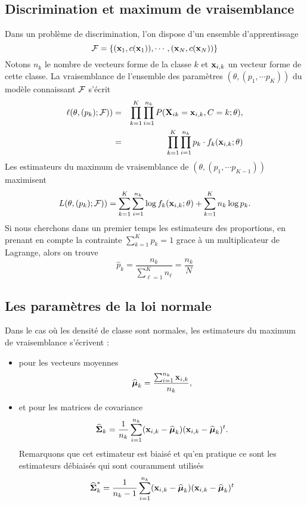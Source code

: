 \subsection{Discrimination et maximum de vraisemblance}
Dans un probl\`eme de discrimination, l'on dispose d'un ensemble 
d'apprentissage 
$$
{\cal F}=\{(\mbox{\bf x}_1,c(\mbox{\bf x}_1)),\cdots,(\mbox{\bf x}_N,c(\mbox{\bf x}_N))\}
$$
Notons $n_k$ le nombre de vecteurs forme de la classe $k$ et 
$\mbox{\bf x}_{i,k}$ un vecteur forme de cette classe. La vraisemblance
de l'ensemble des param\`etres $(\theta,(p_1,\cdots p_{K}))$ du mod\`ele
connaissant ${\cal F}$ s'\'ecrit
\begin{eqnarray*}
\ell(\theta,(p_k); {\cal F})) & = & \prod_{k=1}^K \prod_{i=1}^{n_k} P(\mbox{\bf X}_{ik}=\mbox{\bf x}_{i,k},C=k;\theta),\\
                  & = & \prod_{k=1}^K \prod_{i=1}^{n_k} p_k \cdot f_k(\mbox{\bf x}_{i,k};\theta)
\end{eqnarray*}
Les estimateurs du maximum de vraisemblance de $(\theta,(p_1,\cdots p_{K-1}))$ 
maximisent 
\begin{equation}
L(\theta,(p_k); {\cal F}))  = \sum_{k=1}^{K} \sum_{i=1}^{n_k} \log f_k(\mbox{\bf x}_{i,k};\theta) + \sum_{k=1}^{K} n_k \log p_k.
\end{equation}
Si nous cherchons dans un premier temps les estimateurs des proportions, 
en prenant en compte la contrainte $\sum_{k=1}^{K} p_k =1$ grace \`a
un multiplicateur de Lagrange, alors on trouve
$$
\widehat{p}_k=\frac{n_k}{\sum_{\ell=1}^{K} n_{\ell}}=\frac{n_k}{N}
$$ 

\subsection{Les param\`etres de la loi normale}
Dans le cas o\`u les densit\'e de classe sont normales, 
les estimateurs du maximum  de vraisemblance s'\'ecrivent :
\begin{itemize}
\item pour les vecteurs moyennes 
$$
\widehat{\mbox{\boldmath $\mu$}}_k=\frac{\sum_{i=1}^{n_k}\mbox{\bf x}_{i,k}}{n_k},
$$
\item et pour les matrices de covariance
$$
\widehat{\mbox{\boldmath $\Sigma$}}_k=\frac{1}{n_k} \sum_{i=1}^{n_k} (\mbox{\bf x}_{i,k}-\widehat{\mbox{\boldmath $\mu$}}_k)(\mbox{\bf x}_{i,k}-\widehat{\mbox{\boldmath $\mu$}}_k)^t.
$$
Remarquons que cet estimateur est biais\'e et qu'en pratique ce sont
les estimateurs d\'ebiais\'es qui sont couramment utilis\'es
$$
\widehat{\mbox{\boldmath $\Sigma$}}_k^*=\frac{1}{n_k-1} \sum_{i=1}^{n_k} (\mbox{\bf x}_{i,k}-\widehat{\mbox{\boldmath $\mu$}}_k)(\mbox{\bf x}_{i,k}-\widehat{\mbox{\boldmath $\mu$}}_k)^t
$$
\end{itemize}


